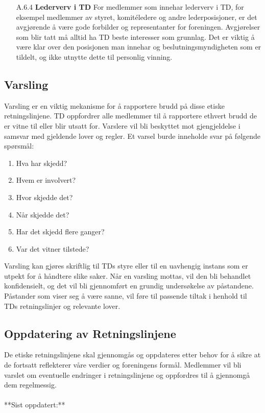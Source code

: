 \documentclass[11pt]{article}
\begin{document}
\begin{itemize}
     \item[A.6.4] \textbf{Lederverv i TD}
     \newline
     For medlemmer som innehar lederverv i TD, for eksempel medlemmer av styret, komitéledere og andre lederposisjoner, er det avgjørende å være gode forbilder og representanter for foreningen. Avgjørelser som blir tatt må alltid ha TD beste interesser som grunnlag. Det er viktig å være klar over den posisjonen man innehar og beslutningsmyndigheten som er tildelt, og ikke utnytte dette til personlig vinning.
 \end{itemize} 
 
\subsection{Varsling}
Varsling er en viktig mekanisme for å rapportere brudd på disse etiske retningslinjene. TD oppfordrer alle medlemmer til å rapportere ethvert brudd de er vitne til eller blir utsatt for. Varslere vil bli beskyttet mot gjengjeldelse i samsvar med gjeldende lover og regler. Et varsel burde inneholde svar på følgende spørsmål:
 \begin{enumerate}
     \item Hva har skjedd?
     \item Hvem er involvert?
     \item Hvor skjedde det?
     \item Når skjedde det?
     \item Har det skjedd flere ganger?
     \item Var det vitner tilstede?
 \end{enumerate}
 
Varsling kan gjøres skriftlig til TDs styre eller til en uavhengig instans som er utpekt for å håndtere slike saker. Når en varsling mottas, vil den bli behandlet konfidensielt, og det vil bli gjennomført en grundig undersøkelse av påstandene. Påstander som viser seg å være sanne, vil føre til passende tiltak i henhold til TDs retningslinjer og relevante lover.
 
\subsection{Oppdatering av Retningslinjene} 
De etiske retningslinjene skal gjennomgås og oppdateres etter behov for å sikre at de fortsatt reflekterer våre verdier og foreningens formål. Medlemmer vil bli varslet om eventuelle endringer i retningslinjene og oppfordres til å gjennomgå dem regelmessig.\\\\
 
**Sist oppdatert:** \date{18.\ september 2023}
\end{document}
